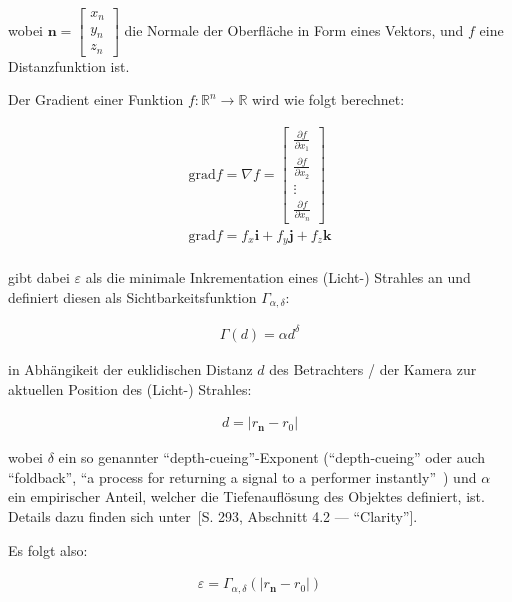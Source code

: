 wobei $\bm{n} = \begin{bmatrix} x_{n} \\ y_{n} \\ z_{n} \end{bmatrix}$
die Normale der Oberfläche in Form eines Vektors, und $f$ eine
Distanzfunktion ist.

Der Gradient einer Funktion $f: \mathbb{R}^{n} \to \mathbb{R}$ wird wie
folgt berechnet:

\begin{gather}
    \text{grad} f = \nabla f = \begin{bmatrix}
        \frac{\partial f}{\partial x_{1}} \\
        \frac{\partial f}{\partial x_{2}} \\
        \vdots \\
        \frac{\partial f}{\partial x_{n}} 
    \end{bmatrix}\\
    \text{grad} f = f_{x}\bm{i} + f_{y}\bm{j} + f_{z}\bm{k}\\
\end{gather}

\cite{hart_ray_1989} gibt dabei $\varepsilon$ als die minimale
Inkrementation eines (Licht-) Strahles an und definiert diesen als
Sichtbarkeitsfunktion $\Gamma_{\alpha, \delta}$:

\begin{gather}
    \Gamma(d) = \alpha d^{\delta}
\end{gather}

in Abhängikeit der euklidischen Distanz
$d$ des Betrachters / der Kamera zur aktuellen Position des (Licht-)
Strahles:

\begin{gather}
    d = |r_{\bm{n}} - r_{0}|
\end{gather}

wobei $\delta$ ein so genannter ``depth-cueing''-Exponent
(``depth-cueing'' oder auch ``foldback'', ``a process for returning a
signal to a performer
instantly''~\cite{liam_collins_sons_&_co._ltd._collins_2015}) und
$\alpha$ ein empirischer Anteil, welcher die Tiefenauflösung des
Objektes definiert,
ist.
Details dazu finden sich unter~\cite{hart_ray_1989}[S. 293, Abschnitt
4.2 --- ``Clarity''].

Es folgt also:

\begin{gather}
    \varepsilon = \Gamma_{\alpha, \delta}(|r_{\bm{n}} - r_0|)
\end{gather}

